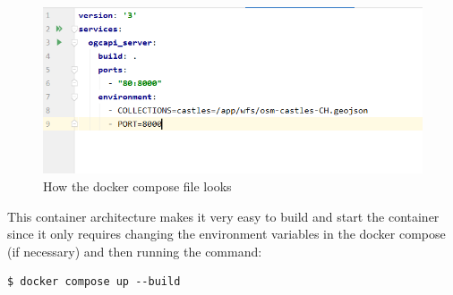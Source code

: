 \newline
\begin{figure}[H]
	\includegraphics[width=\linewidth]{Images/ArchitectureDesign/dockercompose_image.png}
	\caption{How the docker compose file looks}
\end{figure}
This container architecture makes it very easy to build and start the container since it only requires changing the environment variables in the docker compose (if necessary) and then running the command:
\begin{verbatim}
$ docker compose up --build
\end{verbatim}
\newpage

